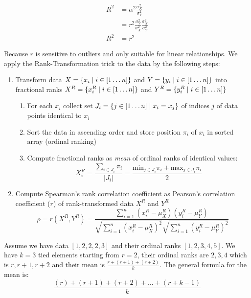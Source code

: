 \documentclass{article}
\begin{document}
\begin{align*}
R^2 &= \alpha^2 \frac{\sigma_X^2}{\sigma_Y^2} \\
&= r^2 \frac{\sigma_Y^2}{\sigma_X^2} \frac{\sigma_X^2}{\sigma_Y^2} \\
R^2 &= r^2
\end{align*}

Because $r$ is sensitive to outliers and only suitable for linear relationships. We apply the Rank-Transformation trick to the data by the following steps:
\begin{enumerate}
    \item Transform data $X = \{x_i \mid i \in [1\dots n]\}$ and $Y = \{y_i \mid i \in [1\dots n]\}$ into fractional ranks $X^R = \{x^R_i \mid i \in [1\dots n]\}$ and $Y^R = \{y^R_i \mid i \in [1\dots n]\}$
    
        \begin{enumerate}
        \item For each $x_i$ collect set $J_i = \{j \in [1 \dots n] \mid x_i = x_j\}$ of indices $j$ of data points identical to $x_i$
        \item Sort the data in ascending order and store position $\pi_i$ of $x_i$ in sorted array (ordinal ranking)
        \item Compute fractional ranks as \textit{mean} of ordinal ranks of identical values:
        \[
        X_i^R = \frac{\sum_{i\in J_i} \pi_i}{|J_i|} = \frac{\text{min}_{j \in J_i} \pi_i + \text{max}_{j \in J_i} \pi_i}{2}
        \]
        \end{enumerate}
    \item Compute Spearman’s rank correlation coefficient as Pearson’s correlation coefficient ($r$) of rank-transformed data $X^R$ and $Y^R$
    \[
    \rho = r(X^R, Y^R) = 
    \frac{\sum_{i=1}^n (x_i^R - \mu_X^R)(y_i^R - \mu_Y^R)}
    {\sqrt{\sum_{i=1}^n (x_i^R - \mu_X^R)^2} \sqrt{\sum_{i=1}^n (y_i^R - \mu_Y^R)^2}}
    \]
\end{enumerate}

Assume we have data $[1,2,2,2,3]$ and their ordinal ranks $[1,2,3,4,5]$. We have $k=3$ tied elements starting from $r=2$, their ordinal ranks are $2,3,4$ which is $r, r+1, r+2$ and their mean is $\frac{r + (r+1)+ (r+2)}{k}$. The general formula for the mean is:
\[
    \frac{(r)+ (r+1)+ (r+2)+ \dots + (r+k-1)}{k}
\]
\end{document}
